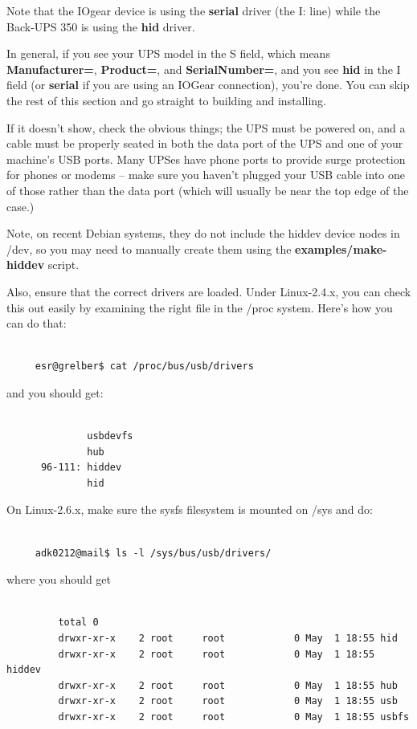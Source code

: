 Note that the IOgear device is using the {\bf serial} driver (the I: line)
while the Back-UPS 350 is using the {\bf hid} driver.  

In general, if you see your UPS model in the S field, which means {\bf
Manufacturer=}, {\bf Product=}, and {\bf SerialNumber=}, and you see {\bf hid}
in the I field (or {\bf serial} if you are using an IOGear connection), you're
done.  You can skip the rest of this section and go straight to building and
installing.  

If it doesn't show, check the obvious things; the UPS must be powered on, and
a cable must be properly seated in both the data port of the UPS and one of
your machine's USB ports.  Many UPSes have phone ports to provide surge
protection for phones or modems {--} make sure you haven't plugged your USB
cable into one of those rather than the data port (which will usually be near
the top edge of the case.)  

Note, on recent Debian systems, they do not include the hiddev device nodes in
/dev, so you may need to manually create them using the {\bf
examples/make-hiddev} script.  

Also, ensure that the correct drivers are loaded. Under Linux-2.4.x, you can
check this out easily by examining the right file in the /proc system.  Here's
how you can do that: 

\footnotesize
\begin{verbatim}
     
     esr@grelber$ cat /proc/bus/usb/drivers
\end{verbatim}
\normalsize

and you should get: 

\footnotesize
\begin{verbatim}
     
              usbdevfs
              hub
      96-111: hiddev
              hid
\end{verbatim}
\normalsize

On Linux-2.6.x, make sure the sysfs filesystem is mounted on /sys and do: 

\footnotesize
\begin{verbatim}
     
     adk0212@mail$ ls -l /sys/bus/usb/drivers/
\end{verbatim}
\normalsize

where you should get 

\footnotesize
\begin{verbatim}
     
         total 0
         drwxr-xr-x    2 root     root            0 May  1 18:55 hid
         drwxr-xr-x    2 root     root            0 May  1 18:55 hiddev
         drwxr-xr-x    2 root     root            0 May  1 18:55 hub
         drwxr-xr-x    2 root     root            0 May  1 18:55 usb
         drwxr-xr-x    2 root     root            0 May  1 18:55 usbfs
\end{verbatim}
\normalsize

